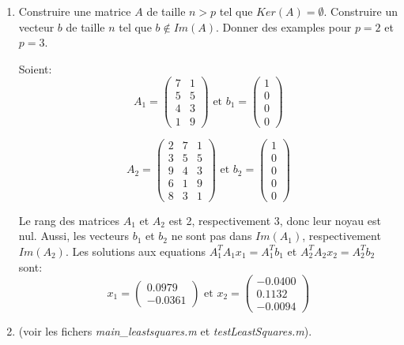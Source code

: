 \documentclass[a4paper,10pt]{article}
\begin{document}
\begin{enumerate}
    \item Construire une matrice $A$ de taille $n > p$ tel que $Ker(A) = \emptyset$.
Construire un vecteur $b$ de taille $n$ tel que $b \notin Im(A)$. Donner des examples
pour $p = 2$ et $p = 3$.

\hbox{}

Soient:
\[
A_1 =
\begin{pmatrix}
  7 & 1 \\
  5 & 5 \\
  4 & 3 \\
  1 & 9
\end{pmatrix}
\text{ et } b_1 =
\begin{pmatrix}
  1 \\
  0 \\
  0 \\
  0
\end{pmatrix}
\]

\[
A_2 =
\begin{pmatrix}
  2 & 7 & 1 \\
  3 & 5 & 5 \\
  9 & 4 & 3 \\
  6 & 1 & 9 \\
  8 & 3 & 1
\end{pmatrix}
\text{ et } b_2 =
\begin{pmatrix}
  1 \\
  0 \\
  0 \\
  0 \\
  0
\end{pmatrix}
\]

Le rang des matrices $A_1$ et $A_2$ est 2, respectivement 3, donc leur noyau est nul.
Aussi, les vecteurs $b_1$ et $b_2$ ne sont pas dans $Im(A_1)$, respectivement $Im(A_2)$.
Les solutions aux equations $A_1^TA_1x_1 = A_1^Tb_1$ et $A_2^TA_2x_2 = A_2^Tb_2$ sont:
\[
x_1 =
\begin{pmatrix}
  0.0979 \\
  -0.0361
\end{pmatrix}
\text{ et } x_2 =
\begin{pmatrix}
  -0.0400 \\
  0.1132 \\
  -0.0094
\end{pmatrix}
\]
    \item (voir les fichers \emph{main\_leastsquares.m} et \emph{testLeastSquares.m}).
\end{enumerate}
\end{document}
